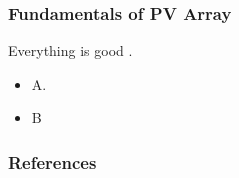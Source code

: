\documentclass{beamer}
\begin{document}
\begin{frame}
    \justify
    \frametitle{Fundamentals of PV Array}
    Everything is good \cite{knuth}.
    \begin{itemize}
        \item A.
        \item B \cite{einstein}
    \end{itemize}   
\end{frame}

\begin{frame}[allowframebreaks]
        \frametitle{References}
    \tiny
    \justifying
    
\end{frame}
\end{document}
